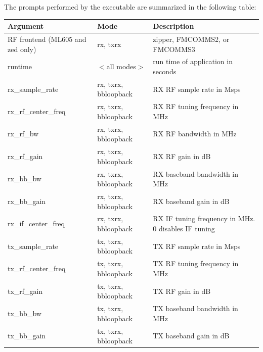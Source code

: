 \begin{minipage}{\linewidth}
The prompts performed by the executable are summarized in the following table:\\
\begin{tabular}{|l|l|p{6.5cm}|}
\hline
\rowcolor{blue}
Argument & Mode & Description \\
\hline
RF frontend (ML605 and zed only) & rx, txrx & zipper, FMCOMMS2, or FMCOMMS3\\
\hline
runtime & $<$all modes$>$ & run time of application in seconds\\
\hline
rx\_sample\_rate & rx, txrx, bbloopback & RX RF sample rate in Msps\\
\hline
rx\_rf\_center\_freq & rx, txrx, bbloopback & RX RF tuning frequency in MHz\\
\hline
rx\_rf\_bw & rx, txrx, bbloopback & RX RF bandwidth in MHz\\
\hline
rx\_rf\_gain & rx, txrx, bbloopback & RX RF gain in dB\\
\hline
rx\_bb\_bw & rx, txrx, bbloopback & RX baseband bandwidth in MHz\\
\hline
rx\_bb\_gain & rx, txrx, bbloopback & RX baseband gain in dB\\
\hline
rx\_if\_center\_freq & rx, txrx, bbloopback & RX IF tuning frequency in MHz. 0 disables IF tuning\\
\hline
tx\_sample\_rate & tx, txrx, bbloopback & TX RF sample rate in Msps\\
\hline
tx\_rf\_center\_freq & tx, txrx, bbloopback & TX RF tuning frequency in MHz\\
\hline
tx\_rf\_gain & tx, txrx, bbloopback & TX RF gain in dB\\
\hline
tx\_bb\_bw & tx, txrx, bbloopback & TX baseband bandwidth in MHz\\
\hline
tx\_bb\_gain & tx, txrx, bbloopback & TX baseband gain in dB\\
\hline
\end{tabular}
\end{minipage}
\medskip
